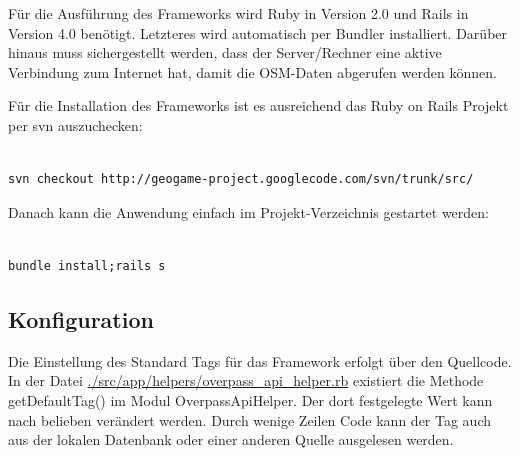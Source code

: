 Für die Ausführung des Frameworks wird Ruby in Version 2.0 und Rails in Version 4.0 benötigt. Letzteres wird automatisch per Bundler installiert.
Darüber hinaus muss sichergestellt werden, dass der Server/Rechner eine aktive Verbindung zum Internet hat, damit die OSM-Daten abgerufen werden können.

Für die Installation des Frameworks ist es ausreichend das Ruby on Rails Projekt per svn auszuchecken:\\\\

\lstset{
   language=Bash
}

\begin{lstlisting}[caption=CLI-Befehl für Code Checkout, label=code:ch8:bash01]
svn checkout http://geogame-project.googlecode.com/svn/trunk/src/
\end{lstlisting}

Danach kann die Anwendung einfach im Projekt-Verzeichnis gestartet werden:\\\\

\begin{lstlisting}[caption=CLI-Befehl für Start des Frameworks, label=code:ch8:bash02]
bundle install;rails s
\end{lstlisting}

\subsection*{Konfiguration}

Die Einstellung des Standard Tags für das Framework erfolgt über den Quellcode.
In der Datei \url{./src/app/helpers/overpass_api_helper.rb} existiert die Methode getDefaultTag() im Modul OverpassApiHelper.
Der dort festgelegte Wert kann nach belieben verändert werden. Durch wenige Zeilen Code kann der Tag auch aus der lokalen Datenbank oder einer anderen Quelle ausgelesen werden.
